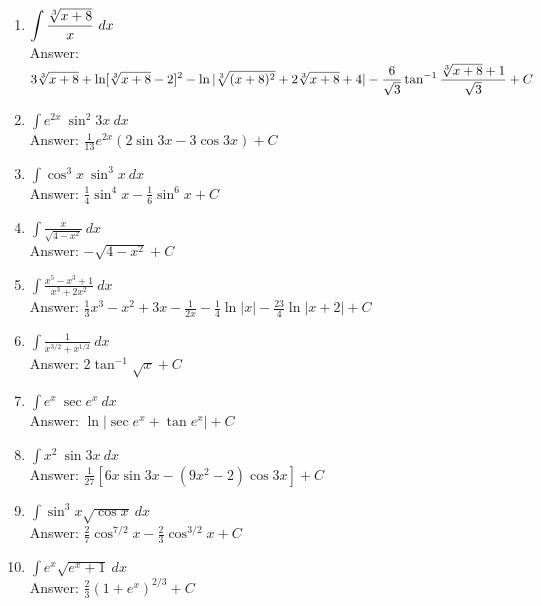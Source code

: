 \documentclass[11pt]{report}
\newcommand{\ds}{\displaystyle}
\begin{document}
\begin{enumerate}
\item $\ds \int \frac{\root 3 \of{x+8}}{x}~dx$\\
Answer: $\ds 3 \root 3 \of{x+8} +\ln [\root 3 \of{x+8}-2]^2 - \ln |\root 3 \of{(x+8)^2}+2\root 3 \of{x+8} +4| -\frac{6}{\sqrt 3} \tan^{-1} \frac{\root 3 \of{x+8} +1}{\sqrt 3} +C$\\

\item $\ds \int e^{2x}~\sin^2 3x~dx$\\
Answer: $\ds\frac{1}{13} e^{2x}(2 \sin 3x - 3\cos 3x) +C$\\

\item $\ds \int \cos^3 x~\sin^3 x~dx$\\
Answer: $\ds\frac{1}{4} \sin^4 x - \frac{1}{6} \sin^6 x +C$\\

\item $\ds \int \frac{x}{\sqrt{4-x^2}}~dx$\\
Answer: $\ds -\sqrt{4-x^2}+C$\\

\item $\ds \int \frac{x^5-x^3+1}{x^3+2x^2}~dx$\\
Answer: $\ds \frac{1}{3} x^3 -x^2 + 3x - \frac{1}{2x} - \frac{1}{4}\ln |x| - \frac{23}{4}\ln|x+2|+C$\\

\item $\ds \int \frac{1}{x^{3/2}+x^{1/2}}~dx$\\
Answer: $\ds 2\tan^{-1} \sqrt x +C$\\

\item $\ds \int e^x~\sec e^x~dx$\\
Answer: $\ds\ln |\sec e^x + \tan e^x| +C$\\

\item $\ds \int x^2~\sin 3x~dx$\\
Answer: $\ds\frac{1}{27}[6x\sin 3x -(9x^2 -2)\cos 3x] +C$\\

\item $\ds \int \sin^3 x \sqrt{\cos x}~dx$\\
Answer: $\ds\frac{2}{7} \cos^{7/2} x - \frac{2}{3} \cos^{3/2} x +C$\\

\item $\ds \int e^x \sqrt{e^x+1}~dx$\\
Answer: $\ds \frac{2}{3} (1+e^x)^{2/3}+C$\\


\end{enumerate}
\end{document}
